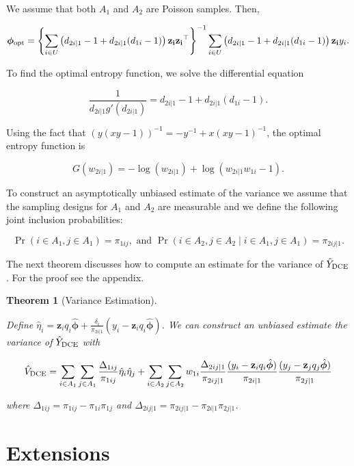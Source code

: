 \documentclass[12pt]{article}
\newtheorem{theorem}{Theorem}
\renewcommand{\bf}[1]{\mathbf{#1}}
\begin{document}
We assume that both $A_1$ and $A_2$ are Poisson samples. Then,

$$
\bm \phi_{\rm opt} = 
\left\{
\sum_{i \in U} \left(d_{2i|1} - 1 + d_{2i|1}(d_{1i} - 1)\right) \bf{z_i}\bf{z_i}^\top
\right\}^{-1}
\sum_{i \in U} \left(d_{2i|1} - 1 + d_{2i|1}(d_{1i} - 1)\right) \bf{z_i} y_i.
$$

To find the optimal entropy function, we solve the differential equation

$$
\frac{1}{d_{2i|1} g'(d_{2i|1})} = d_{2i|1} - 1 + d_{2i|1}(d_{1i} - 1).
$$

Using the fact that $(y(xy-1))^{-1} = -y^{-1} + x(xy-1)^{-1}$, the optimal
entropy function is 

$$
G(w_{2i|1}) = - \log(w_{2i|1}) + \log(w_{2i|1}w_{1i} - 1).
$$

To construct an asymptotically unbiased estimate of the variance we assume that
the sampling designs for $A_1$ and $A_2$ are measurable and we define the
following joint inclusion probabilities:

$$
\Pr(i \in A_1, j \in A_1) = \pi_{1ij}, \text{ and }
\Pr(i \in A_2, j \in A_2 \mid i \in A_1, j \in A_1) = \pi_{2ij|1}.
$$

The next theorem discusses how to compute an estimate for the variance of 
$\hat Y_{\rm DCE}$. For the proof see the appendix.

\begin{theorem}[Variance Estimation]\label{thm:mainvar}

  Define $\hat \eta_i = \bf z_i q_i \hat{\bm \phi} + 
  \frac{\delta_i}{\pi_{2i|1}}(y_i - \bf z_i q_i \hat{\bm \phi})$.
  We can construct an unbiased estimate the variance of $\hat Y_{\rm DCE}$ with

  $$
  \hat V_{\rm DCE} 
  = \sum_{i \in A_1} \sum_{j \in A_1} \frac{\Delta_{1ij}}{\pi_{1ij}} 
  \hat \eta_i \hat \eta_j
  + \sum_{i \in A_2} \sum_{j \in A_2} w_{1i} \frac{\Delta_{2ij|1}}{\pi_{2ij|1}} 
  \frac{(y_i - \bf z_i q_i \hat{\bm \phi})}{\pi_{2i|1}}
  \frac{(y_j - \bf z_j q_j \hat{\bm \phi})}{\pi_{2j|1}}
  $$

  where $\Delta_{1ij} = \pi_{1ij} - \pi_{1i}\pi_{1j}$ and 
  $\Delta_{2ij|1} = \pi_{2ij|1} - \pi_{2i|1}\pi_{2j|1}$.

\end{theorem}

\section{Extensions}
\end{document}
